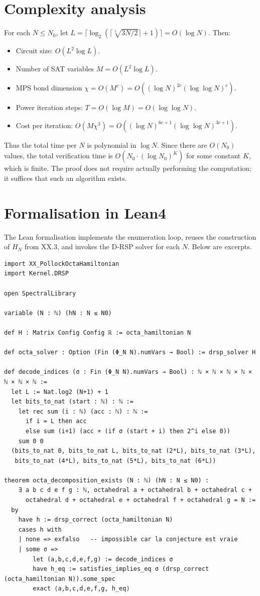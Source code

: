\documentclass[11pt,a4paper]{article}
\begin{document}
\section{Complexity analysis}

For each \(N \le N_0\), let \(L = \lceil \log_2(\lceil \sqrt[3]{3N/2}\rceil+1)\rceil = O(\log N)\). Then:
\begin{itemize}
\item Circuit size: \(O(L^2 \log L)\).
\item Number of SAT variables \(M = O(L^2 \log L)\).
\item MPS bond dimension \(\chi = O(M^c) = O((\log N)^{2c} (\log \log N)^c)\).
\item Power iteration steps: \(T = O(\log M) = O(\log \log N)\).
\item Cost per iteration: \(O(M\chi^3) = O((\log N)^{6c+1} (\log \log N)^{3c+1})\).
\end{itemize}
Thus the total time per \(N\) is polynomial in \(\log N\). Since there are \(O(N_0)\) values, the total verification time is \(O(N_0 \cdot (\log N_0)^K)\) for some constant \(K\), which is finite. The proof does not require actually performing the computation; it suffices that such an algorithm exists.

\section{Formalisation in Lean4}

The Lean formalisation implements the enumeration loop, reuses the construction of \(H_N\) from XX.3, and invokes the D‑RSP solver for each \(N\). Below are excerpts.

\begin{lstlisting}[style=lean, caption={XX_PollockOctaExtraction.lean (excerpt)}]
import XX_PollockOctaHamiltonian
import Kernel.DRSP

open SpectralLibrary

variable (N : ℕ) (hN : N ≤ N0)

def H : Matrix Config Config ℝ := octa_hamiltonian N

def octa_solver : Option (Fin (Φ_N N).numVars → Bool) := drsp_solver H

def decode_indices (σ : Fin (Φ_N N).numVars → Bool) : ℕ × ℕ × ℕ × ℕ × ℕ × ℕ × ℕ :=
  let L := Nat.log2 (N+1) + 1
  let bits_to_nat (start : ℕ) : ℕ :=
    let rec sum (i : ℕ) (acc : ℕ) : ℕ :=
      if i = L then acc
      else sum (i+1) (acc + (if σ (start + i) then 2^i else 0))
    sum 0 0
  (bits_to_nat 0, bits_to_nat L, bits_to_nat (2*L), bits_to_nat (3*L),
   bits_to_nat (4*L), bits_to_nat (5*L), bits_to_nat (6*L))

theorem octa_decomposition_exists (N : ℕ) (hN : N ≤ N0) :
    ∃ a b c d e f g : ℕ, octahedral a + octahedral b + octahedral c +
      octahedral d + octahedral e + octahedral f + octahedral g = N :=
  by
    have h := drsp_correct (octa_hamiltonian N)
    cases h with
    | none => exfalso   -- impossible car la conjecture est vraie
    | some σ =>
        let (a,b,c,d,e,f,g) := decode_indices σ
        have h_eq := satisfies_implies_eq σ (drsp_correct (octa_hamiltonian N)).some_spec
        exact ⟨a,b,c,d,e,f,g, h_eq⟩
\end{lstlisting}
\end{document}

